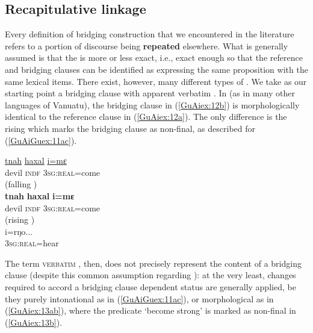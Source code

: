 \documentclass[output=paper]{LSP/langsci}
\begin{document}
\subsection{Recapitulative linkage}
\label{GuAi3.1recap}
Every definition of bridging construction that we encountered in the literature refers to a portion of discourse being \textbf{repeated} elsewhere. What is generally assumed is that the  is more or less exact, i.e., exact enough so that the reference and bridging clauses can be identified as expressing the same proposition with the same lexical items. There exist, however, many different types of  \citep[][224]{brown.2000}. We take as our starting point a bridging clause with apparent verbatim . In  (as in many other  languages of Vanuatu), the bridging clause in (\ref{GuAiex:12b}) is morphologically identical to the reference clause in (\ref{GuAiex:12a}). The only difference is the rising  which marks the bridging clause as non-final, as described for (\ref{GuAiGuex:11ac}).


\begin{exe}
\ex \label{GuAiex:12ac}
\begin{xlist}
\ex \label{GuAiex:12a}
\gll \underline{tnah}   \underline{haxal}   \underline{i=mɛ}\\
devil   \textsc{indf}   \textsc{3sg:real}=come \\
\glt {} (falling )\\
\ex \label{GuAiex:12b}
\gll \textbf{tnah}  \textbf{ haxal}   \textbf{i=mɛ} \\
devil   \textsc{indf}   \textsc{3sg:real}=come\\
\glt {} (rising )\\
\ex \label{GuAiex:12c}
\gll   i=rŋo...\\     	       
\textsc{3sg:real}=hear\\
\glt {} 
\end{xlist}
\end{exe}



The term \textsc{verbatim} , then, does not precisely represent the content of a bridging clause (despite this common assumption regarding ): at the very least, changes required to accord a bridging clause dependent status are generally applied, be they purely intonational as in (\ref{GuAiGuex:11ac}), or morphological as in (\ref{GuAiex:13ab}), where the predicate `become strong' is marked as non-final in (\ref{GuAiex:13b}).
\end{document}
